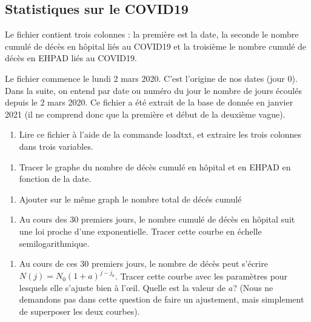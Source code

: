 \documentclass[letterpaper,10pt,english]{sphinxhowto}
\begin{document}
\subsection{Statistiques sur le COVID\sphinxhyphen{}19}
\label{\detokenize{cours7_graphiques_exercices:statistiques-sur-le-covid-19}}
\sphinxAtStartPar
Le fichier  contient trois colonnes : la première est la date, la seconde le nombre cumulé de décès en hôpital liés au COVID\sphinxhyphen{}19 et la troisième le nombre cumulé de décès en EHPAD liés au COVID\sphinxhyphen{}19.

\sphinxAtStartPar
Le fichier commence le lundi 2 mars 2020. C’est l’origine de nos dates (jour 0). Dans la suite, on entend par date ou numéro du jour le nombre de jours écoulés depuis le 2 mars 2020. Ce fichier a été extrait de la base de donnée en janvier 2021 (il ne comprend donc que la première et début de la deuxième vague).
\begin{enumerate}
%
\item {} 
\sphinxAtStartPar
Lire ce fichier à l’aide de la commande loadtxt, et extraire les trois colonnes dans trois variables.

\end{enumerate}
\begin{enumerate}
%
\setcounter{enumi}{1}
\item {} 
\sphinxAtStartPar
Tracer le graphe du nombre de décès cumulé en hôpital et en EHPAD en fonction de la date.

\end{enumerate}
\begin{enumerate}
%
\setcounter{enumi}{2}
\item {} 
\sphinxAtStartPar
Ajouter sur le même graph le nombre total de décés cumulé

\end{enumerate}
\begin{enumerate}
%
\setcounter{enumi}{3}
\item {} 
\sphinxAtStartPar
Au cours des 30 premiers jours, le nombre cumulé de décès en hôpital suit une loi proche d’une exponentielle. Tracer cette courbe en échelle semi\sphinxhyphen{}logarithmique.

\end{enumerate}
\begin{enumerate}
%
\setcounter{enumi}{4}
\item {} 
\sphinxAtStartPar
Au cours de ces 30 premiers jours, le nombre de décès peut s’écrire \(N(j) = N_0(1+a)^{j-j_0}\). Tracer cette courbe avec les paramètres pour lesquels elle s’ajuste bien à l’œil. Quelle est la valeur de \(a\)? (Nous ne demandons pas dans cette question de faire un ajustement, mais simplement de superposer les deux courbes).

\end{enumerate}
\end{document}
